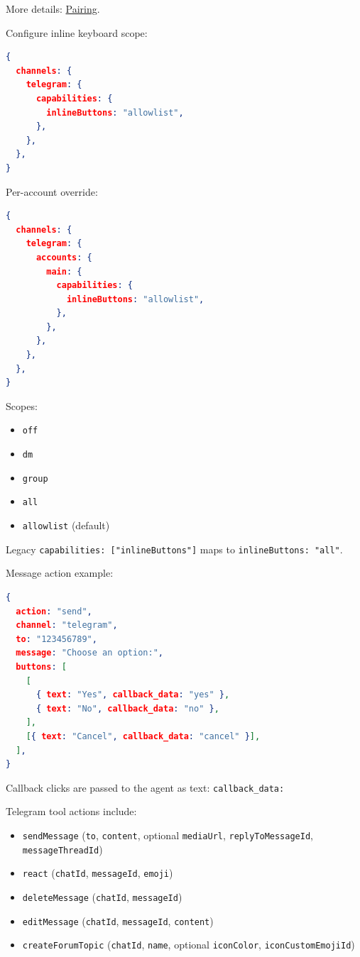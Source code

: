 More details: \href{/channels/pairing\#pair-via-telegram-recommended-for-ios}{Pairing}.


Configure inline keyboard scope:

\begin{lstlisting}[language=json]
{
  channels: {
    telegram: {
      capabilities: {
        inlineButtons: "allowlist",
      },
    },
  },
}
\end{lstlisting}


Per-account override:

\begin{lstlisting}[language=json]
{
  channels: {
    telegram: {
      accounts: {
        main: {
          capabilities: {
            inlineButtons: "allowlist",
          },
        },
      },
    },
  },
}
\end{lstlisting}


Scopes:

\begin{itemize}
  \item \texttt{off}
  \item \texttt{dm}
  \item \texttt{group}
  \item \texttt{all}
  \item \texttt{allowlist} (default)
\end{itemize}


Legacy \texttt{capabilities: ["inlineButtons"]} maps to \texttt{inlineButtons: "all"}.

Message action example:

\begin{lstlisting}[language=json]
{
  action: "send",
  channel: "telegram",
  to: "123456789",
  message: "Choose an option:",
  buttons: [
    [
      { text: "Yes", callback_data: "yes" },
      { text: "No", callback_data: "no" },
    ],
    [{ text: "Cancel", callback_data: "cancel" }],
  ],
}
\end{lstlisting}


Callback clicks are passed to the agent as text:
\texttt{callback\_data: }


Telegram tool actions include:

\begin{itemize}
  \item \texttt{sendMessage} (\texttt{to}, \texttt{content}, optional \texttt{mediaUrl}, \texttt{replyToMessageId}, \texttt{messageThreadId})
  \item \texttt{react} (\texttt{chatId}, \texttt{messageId}, \texttt{emoji})
  \item \texttt{deleteMessage} (\texttt{chatId}, \texttt{messageId})
  \item \texttt{editMessage} (\texttt{chatId}, \texttt{messageId}, \texttt{content})
  \item \texttt{createForumTopic} (\texttt{chatId}, \texttt{name}, optional \texttt{iconColor}, \texttt{iconCustomEmojiId})
\end{itemize}



